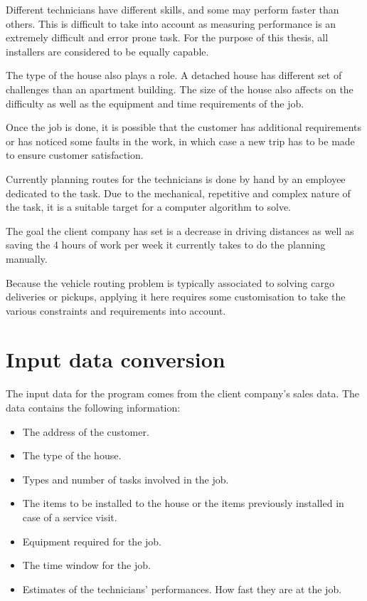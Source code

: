 Different technicians have different skills, and some may perform faster than others. This is difficult to take into account as measuring performance is an extremely difficult and error prone task. For the purpose of this thesis, all installers are considered to be equally capable.

The type of the house also plays a role. A detached house has different set of challenges than an apartment building. The size of the house also affects on the difficulty as well as the equipment and time requirements of the job.

Once the job is done, it is possible that the customer has additional requirements or has noticed some faults in the work, in which case a new trip has to be made to ensure customer satisfaction. 

Currently planning routes for the technicians is done by hand by an employee dedicated to the task. Due to the mechanical, repetitive and complex nature of the task, it is a suitable target for a computer algorithm to solve.

The goal the client company has set is a decrease in driving distances as well as saving the 4 hours of work per week it currently takes to do the planning manually.


Because the vehicle routing problem is typically associated to solving cargo deliveries or pickups, applying it here requires some customisation to take the various constraints and requirements into account. 

\section{Input data conversion}
\label{subsection:dataconversion}

The input data for the program comes from the client company's sales data. The data contains the following information:

\begin{itemize}
\item The address of the customer.
\item The type of the house.
\item Types and number of tasks involved in the job.
\item The items to be installed to the house or the items previously installed in case of a service visit.
\item Equipment required for the job.
\item The time window for the job.
\item Estimates of the technicians' performances. How fast they are at the job.
\end{itemize}

